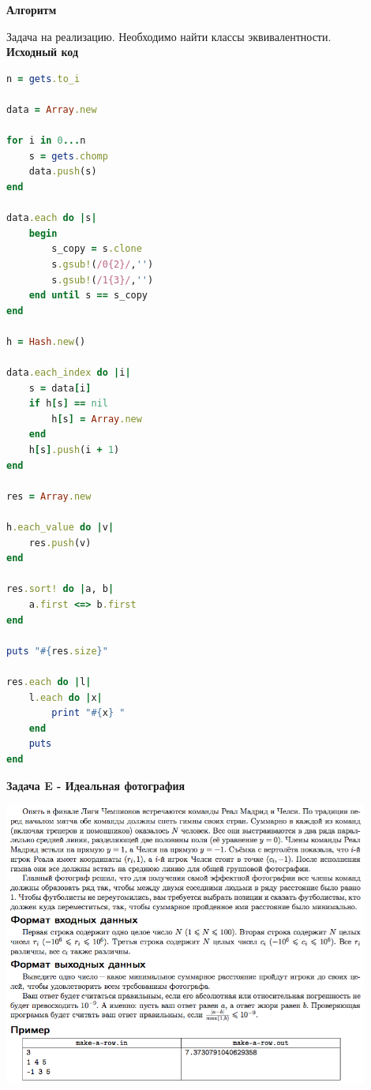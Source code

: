 \documentclass[a4paper,12pt]{article}
\begin{document}
\textbf{{\large Алгоритм}}

Задача на реализацию. Необходимо найти классы эквивалентности. \\

\newpage
\textbf{{\large Исходный код}} \\
\begin{lstlisting}[language=Ruby]
n = gets.to_i

data = Array.new

for i in 0...n
    s = gets.chomp
    data.push(s)
end

data.each do |s|
    begin
        s_copy = s.clone
        s.gsub!(/0{2}/,'')
        s.gsub!(/1{3}/,'')
    end until s == s_copy
end

h = Hash.new()

data.each_index do |i|
    s = data[i]
    if h[s] == nil
        h[s] = Array.new
    end
    h[s].push(i + 1)
end

res = Array.new

h.each_value do |v|
    res.push(v)
end

res.sort! do |a, b|
    a.first <=> b.first
end

puts "#{res.size}"

res.each do |l|
    l.each do |x|
        print "#{x} "
    end
    puts
end

\end{lstlisting}

\newpage
\textbf{{\large Задача E - Идеальная фотография}}

\begin{center}
\includegraphics[width=0.9\textwidth]{OC_Peterhof/E.png}\\ [1cm]
\end{center}
\end{document}
